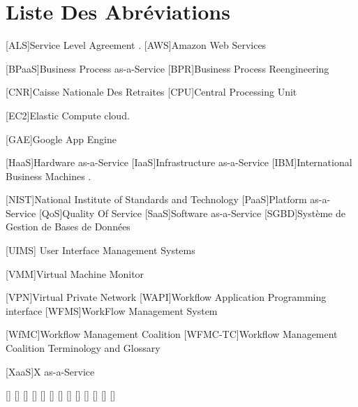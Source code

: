  
 \chapter*{Liste Des Abréviations}
 \begin{acronym}
 		{Service Level Agreement} .	 
 		{Amazon Web Services}
 		
 		    [BPaaS]{Business Process as-a-Service}	 
 		{Business Process Reengineering} 
 		
 		   {Caisse Nationale Des Retraites}
 			[CPU]{Central Processing Unit}
 		
 [EC2]{Elastic Compute cloud}.
 		
 		  	[GAE]{Google App Engine}	
 		
 		[HaaS]{Hardware as-a-Service}
 		[IaaS]{Infrastructure as-a-Service}	
 	[IBM]{International Business Machines}	 .
 	
 	
 	
 	    [NIST]{National Institute of Standards and Technology} 	
 	    			[PaaS]{Platform as-a-Service}	
 	   [QoS]{Quality Of Service}	 
 	   	[SaaS]{Software as-a-Service}	
 	   	  [SGBD]{Système de Gestion de Bases de Données}

    	
    	


 [UIMS]{ User Interface Management Systems}
 	   
[VMM]{Virtual Machine Monitor}  

 	  [VPN]{Virtual Private Network}
[WAPI]{Workflow Application Programming interface}
    	[WFMS]{WorkFlow Management System}
    	
    	
    	[WfMC]{Workflow Management Coalition }
    	[WFMC-TC]{Workflow Management Coalition Terminology and Glossary}		
    
	[XaaS]{X as-a-Service}	

 	  
 	  
 	  
 	  
   
 	       	  
 	       \acro{}[]{}
 	       \acro{}[]{}
 	       \acro{}[]{}
 	       \acro{}[]{}
 	       \acro{}[]{}
 	       \acro{}[]{}
 	       \acro{}[]{}
 	       \acro{}[]{}
 	       \acro{}[]{}
 	       \acro{}[]{}
 	       \acro{}[]{}
 	       \acro{}[]{}
 	       \acro{}[]{}
 	      
 	       
 \end{acronym}
 
